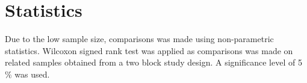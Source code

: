 \section{Statistics}
Due to the low sample size, comparisons was made using non-parametric statistics. Wilcoxon signed rank test was applied as comparisons was made on related samples obtained from a two block study design. A significance level of 5 $\percent$ was used.